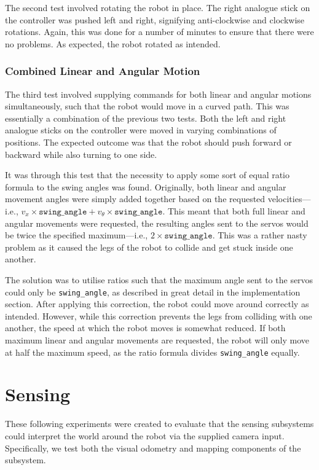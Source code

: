The second test involved rotating the robot in place. The right analogue stick on the controller was pushed left and right, signifying anti-clockwise and clockwise rotations. Again, this was done for a number of minutes to ensure that there were no problems. As expected, the robot rotated as intended.

\subsubsection{Combined Linear and Angular Motion}

The third test involved supplying commands for both linear and angular motions simultaneously, such that the robot would move in a curved path. This was essentially a combination of the previous two tests. Both the left and right analogue sticks on the controller were moved in varying combinations of positions. The expected outcome was that the robot should push forward or backward while also turning to one side.

It was through this test that the necessity to apply some sort of equal ratio formula to the swing angles was found. Originally, both linear and angular movement angles were simply added together based on the requested velocities---i.e., $v_x \times \texttt{swing\_angle} + v_\theta \times \texttt{swing\_angle}$. This meant that both full linear and angular movements were requested, the resulting angles sent to the servos would be twice the specified maximum---i.e., $2 \times \texttt{swing\_angle}$. This was a rather nasty problem as it caused the legs of the robot to collide and get stuck inside one another.

The solution was to utilise ratios such that the maximum angle sent to the servos could only be \texttt{swing\_angle}, as described in great detail in the implementation section. After applying this correction, the robot could move around correctly as intended. However, while this correction prevents the legs from colliding with one another, the speed at which the robot moves is somewhat reduced. If both maximum linear and angular movements are requested, the robot will only move at half the maximum speed, as the ratio formula divides \texttt{swing\_angle} equally.

\section{Sensing}

These following experiments were created to evaluate that the sensing subsystems could interpret the world around the robot via the supplied camera input. Specifically, we test both the visual odometry and mapping components of the subsystem.

